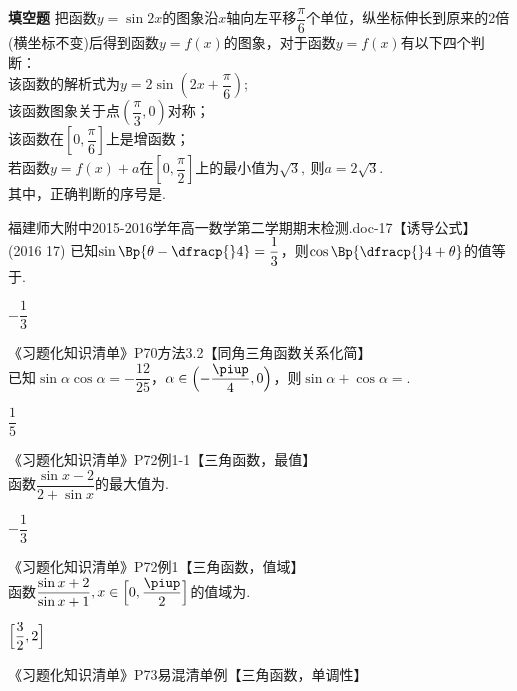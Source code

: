 \begin{exercise}{\bf 填空题}
      把函数$ y=\sin 2x $的图象沿$x$轴向左平移$ \dfrac{\pi}{6} $个单位，纵坐标伸长到原来的2倍(横坐标不变)后得到函数$ y=f(x) $的图象，对于函数$ y=f(x) $有以下四个判断：\\
       该函数的解析式为$ y=2\sin \left(2x+\dfrac{\pi}{6}\right) $;\\
       该函数图象关于点$ \left(\dfrac{\pi}{3},0\right) $对称；\\
       该函数在$ \left[0,\dfrac{\pi}{6}\right] $上是增函数；\\
       若函数$ y=f(x)+a $在$ \left[0,\dfrac{\pi}{2}\right] $上的最小值为$ \sqrt{3},\  $则$ a=2\sqrt{3} .$\\
      其中，正确判断的序号是\tk.
      \begin{answer}
      \end{answer}
    \item 福建师大附中2015-2016学年高一数学第二学期期末检测.doc-17【诱导公式】\\
      (2016  17)
      已知$\sin\Bp{\theta-\dfracp{}4}=\dfrac13$，则$\cos\Bp{\dfracp{}4+\theta}$的值等于\tk.
      \begin{answer}
        $-\dfrac13$
      \end{answer}
    \item 《习题化知识清单》P70方法3.2【同角三角函数关系化简】\\
      已知$\sin\alpha\cos\alpha=-\dfrac{12}{25}$，$\alpha\in\Bigl(-\dfrac{\piup}4,0\Bigr)$，则$\sin\alpha+\cos\alpha=$\tk.
      \begin{answer}
        $\dfrac{1}{5}$
      \end{answer}
    \item 《习题化知识清单》P72例1-1【三角函数，最值】\\
      函数$\dfrac{\sin x-2}{2+\sin x}$的最大值为\tk.
      \begin{answer}
        $-\dfrac13$
      \end{answer}
    \item 《习题化知识清单》P72例1【三角函数，值域】\\
      函数$\dfrac{\sin x+2}{\sin x+1},x\in\Bigl[0,\dfrac{\piup}2\Bigr]$的值域为\tk.
      \begin{answer}
        $\Bigl[\dfrac32,2\Bigr]$
      \end{answer}
    \item 《习题化知识清单》P73易混清单例【三角函数，单调性】\\

\end{exercise}
